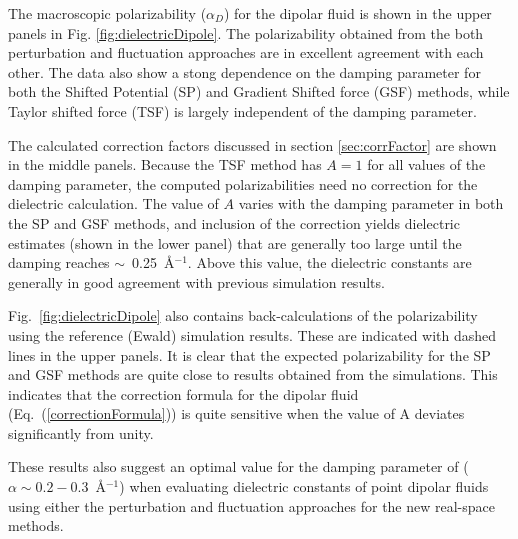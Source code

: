 The macroscopic polarizability ($\alpha_D$) for the dipolar fluid is
shown in the upper panels in Fig. \ref{fig:dielectricDipole}.  The
polarizability obtained from the both perturbation and fluctuation
approaches are in excellent agreement with each other.  The data also
show a stong dependence on the damping parameter for both the Shifted
Potential (SP) and Gradient Shifted force (GSF) methods, while Taylor
shifted force (TSF) is largely independent of the damping
parameter.

The calculated correction factors discussed in section
\ref{sec:corrFactor} are shown in the middle panels. Because the TSF
method has $A = 1$ for all values of the damping parameter, the
computed polarizabilities need no correction for the dielectric
calculation. The value of $A$ varies with the damping parameter in
both the SP and GSF methods, and inclusion of the correction yields
dielectric estimates (shown in the lower panel) that are generally too
large until the damping reaches $\sim$~0.25~\AA$^{-1}$. Above this
value, the dielectric constants are generally in good agreement with
previous simulation results.\cite{NeumannI83}

Fig.~\ref{fig:dielectricDipole} also contains back-calculations of
the polarizability using the reference (Ewald) simulation
results.\cite{NeumannI83} These are indicated with dashed lines in the
upper panels.  It is clear that the expected polarizability for the SP
and GSF methods are quite close to results obtained from the
simulations.  This indicates that the correction formula for the
dipolar fluid (Eq.~(\ref{correctionFormula})) is quite sensitive when
the value of $\mathrm{A}$ deviates significantly from unity.

These results also suggest an optimal value for the damping parameter
of ($\alpha \sim 0.2-0.3$~\AA$^{-1}$) when evaluating dielectric
constants of point dipolar fluids using either the perturbation and
fluctuation approaches for the new real-space methods.

